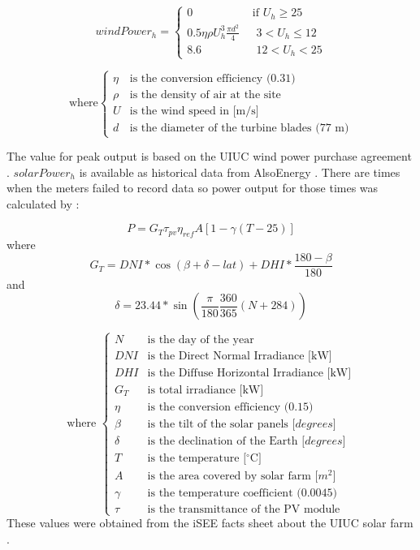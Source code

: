 \begin{equation}
	windPower_h = \begin{cases}
		0 &\text{ if $U_h \geq 25$}\\
		0.5\eta\rho U_h^3\frac{\pi d^2}{4} &\text{ $3 < U_h \leq 12$}\\
		8.6 &\text{ $12 < U_h < 25$}
	\end{cases}
\end{equation}

\begin{equation*}
	\text{where} \begin{cases}
			\eta &\text{is the conversion efficiency (0.31)}\\
	\rho &\text{is the density of air at the site}\\
	U &\text{is the wind speed in [m/s]}\\
	d &\text{is the diameter of the turbine blades (77 m)}
	\end{cases}
\end{equation*}

The value for peak output is based on the UIUC wind power purchase agreement \cite{breitweiser_wind_2016}. $solarPower_h$ is available as historical data from AlsoEnergy \cite{alsoenergy_university_2019}. There are times when the meters failed to record data so power output for those times was calculated by \cite{garcia_nuclear_2015}:

\begin{equation}
 	P = G_T\tau_{pv}\eta_{ref}A[1-\gamma(T-25)]
\end{equation} 
where 
\begin{equation}
	G_T = DNI*\cos(\beta+\delta-lat)+DHI*\frac{180-\beta}{180}
\end{equation}
and
\begin{equation}
	\delta = 23.44*\sin(\frac{\pi}{180}\frac{360}{365}(N+284))
\end{equation}

\begin{equation*}
	\text{where } \begin{cases}
	N &\text{is the day of the year}\\
	DNI &\text{is the Direct Normal Irradiance [kW]}\\
	DHI &\text{is the Diffuse Horizontal Irradiance [kW]}\\
	G_T &\text{is total irradiance [kW]}\\
	\eta &\text{is the conversion efficiency (0.15)}\\
	\beta &\text{is the tilt of the solar panels [$degrees$]}\\
	\delta &\text{is the declination of the Earth [$degrees$]}\\
	T &\text{is the temperature [$^\circ$C]}\\
	A &\text{is the area covered by solar farm [$m^2$]} \\
	\gamma &\text{is the temperature coefficient (0.0045)}\\
	\tau &\text{is the transmittance of the PV module}
	\end{cases}
\end{equation*}
These values were obtained from the iSEE facts sheet about the UIUC solar farm \cite{white_solar_2017}. 

